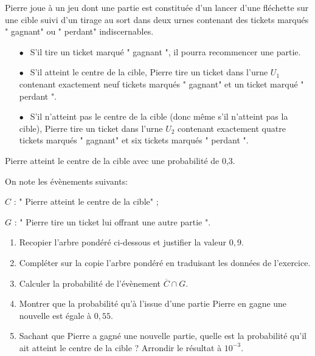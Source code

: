 \documentclass[11pt]{article}
\begin{document}
 \begin{correction} 
 \medskip

Pierre joue à un jeu dont une partie est constituée d'un lancer d'une fléchette sur une cible suivi d'un tirage au sort dans deux urnes contenant des tickets marqués " gagnant" ou
" perdant" indiscernables.

\setlength\parindent{8mm}
\begin{itemize}
\item[$\bullet~~$] S'il tire un ticket marqué " gagnant ", il pourra recommencer une partie.
\item[$\bullet~~$] S'il atteint le centre de la cible, Pierre tire un ticket dans l'urne $U_1$ contenant exactement neuf tickets marqués " gagnant" et un ticket marqué " perdant ".
\item[$\bullet~~$] S'il n'atteint pas le centre de la cible (donc même s'il n'atteint pas la cible), Pierre tire un ticket dans l'urne $U_2$ contenant exactement quatre tickets marqués " gagnant" et six tickets marqués " perdant ".
\end{itemize}
\setlength\parindent{0mm}

\smallskip

Pierre atteint le centre de la cible avec une probabilité de 0,3.

\smallskip
On note les évènements suivants:

\qquad $C$ : " Pierre atteint le centre de la cible" ;

\qquad $G$ : " Pierre tire un ticket lui offrant une autre partie ".

\medskip

\begin{enumerate}
\item Recopier l'arbre pondéré ci-dessous et justifier la valeur $0,9$.

\item Compléter sur la copie l'arbre pondéré en traduisant les données de l'exercice.
\item Calculer la probabilité de l'évènement $\overline{C} \cap G$.
\item Montrer que la probabilité qu'à l'issue d'une partie Pierre en gagne une nouvelle est égale à $0,55$.
\item Sachant que Pierre a gagné une nouvelle partie, quelle est la probabilité qu'il ait atteint le centre de la cible ? Arrondir le résultat à $10^{-3}$.
\end{enumerate} 
 \end{correction}
\end{document}
